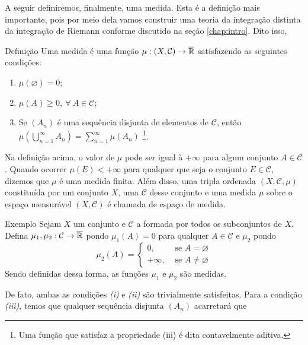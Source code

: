 A seguir definiremos, finalmente, uma medida.
Esta é a definição mais importante, pois por meio dela vamos construir uma teoria da integração distinta da integração de Riemann conforme discutido na seção \ref{chap:intro}.
Dito isso, 
\begin{env}{Definição}
\label{def:medida}
    Uma medida é uma função $\mu: (X, \mathcal{C}) \to \operatorname{\overline{\mathbb{R}}}$ satisfazendo as seguintes condições:
    \begin{enumerate}[label* = (\roman*)]
        \item $\mu(\varnothing) = 0$;
        \item $\mu(A) \geq 0, \ \forall \ A \in \mathcal{C}$;
        \item Se $(A_n)$ é uma sequência disjunta de elementos de  $\mathcal{C}$, então 
        $\displaystyle\mu\left(\bigcup_{n = 1}^\infty A_n\right) = \sum_{n = 1}^\infty\mu(A_n)$
        \footnote{
        	Uma função que satisfaz a propriedade (iii) é dita contavelmente aditiva.
        	}.
    \end{enumerate}
\end{env}

Na definição acima, o valor de $\mu$ pode ser igual à $+\infty$ para algum conjunto $A \in \mathcal{C}$.
Quando ocorrer $\mu(E) < +\infty$ para qualquer que seja o conjunto $E \in \mathcal{C}$, dizemos que $\mu$ é uma medida finita. 
Além disso, uma tripla ordenada $(X, \mathcal{C}, \mu)$ constituída por um conjunto $X$, uma \sigal $\mathcal{C}$ desse conjunto e uma medida $\mu$ sobre o espaço mensurável $(X, \mathcal{C})$ é chamada de espaço de medida.


\begin{env}{Exemplo}
    Sejam $X$ um conjunto e $\mathcal{C}$ a \sigal formada por todos os subconjuntos de $X$.    
    Defina $\mu_1, \mu_2:\mathcal{C} \to \operatorname{\overline{\mathbb{R}}}$ pondo $\mu_1(A) = 0$ para qualquer  $A \in \mathcal{C}$ e 
    $\mu_2$  pondo 
	$$\mu_2(A) = \left\{\begin{array}{cc}
	0, & \textrm{\ se \ } A = \varnothing \\
	+\infty,& \textrm{\ se \ } A \neq \varnothing
	\end{array}\right.$$
	Sendo definidas dessa forma, as funções $\mu_1$ e $\mu_2$ são medidas.
	\end{env}

De fato, ambas as condições \textit{(i)} e \textit{(ii)} são trivialmente satisfeitas.
Para a condição \textit{(iii)}, temos que qualquer sequência disjunta $(A_n)$ acarretará que

